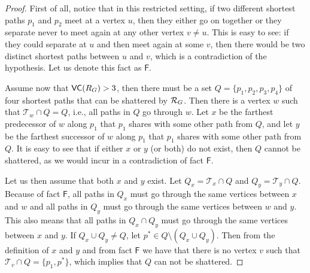\begin{proof}
  First of all, notice that in this restricted setting, if two different
  shortest paths $p_1$ and $p_2$ meet at a vertex $u$, then they either go on
  together or %
  they separate never to meet again at any other
  vertex $v\neq u$. This is easy to see: if they could separate at $u$ and then
  meet again at some $v$, then there would be two distinct shortest paths
  between $u$ and $v$, which is a contradiction of the hypothesis. Let us denote
  this fact as $\mathsf{F}$.

  Assume now that $\mathsf{VC}(R_G)>3$, then there must be a set
  $Q=\{p_1,p_2,p_3,p_4\}$ of four shortest paths that can be shattered by
  $\mathcal{R}_G$. Then there is a vertex $w$ such that $\mathcal{T}_w\cap Q=Q$, i.e.,
  all paths in $Q$ go through $w$. Let $x$ be the farthest predecessor of $w$
  along $p_1$ that $p_1$ shares with some other path from $Q$, and let $y$ be
  the farthest successor of $w$ along $p_1$ that $p_1$ shares with some other
  path from $Q$. It is easy to see that if either $x$ or $y$ (or both) do not
  exist, then $Q$ cannot be shattered, as we would incur in a contradiction of
  fact $\mathsf{F}$. 
  
  Let us then assume that both $x$ and $y$ exist.
  Let $Q_x=\mathcal{T}_x\cap Q$ and $Q_y=\mathcal{T}_y\cap Q$.
  Because of fact $\mathsf{F}$, all paths in $Q_x$ must go through the same vertices
  between $x$ and $w$ and all paths in $Q_y$ must go through the same vertices
  between $w$ and $y$. This also means that all paths in $Q_x\cap Q_y$ must go
  through the same vertices between $x$ and $y$. If $Q_x\cup Q_y\neq Q$, let
  $p^*\in Q\setminus(Q_x\cup Q_y)$. Then from the definition of $x$ and $y$ and
  from fact $\mathsf{F}$ we have that there is no vertex $v$ such that
  $\mathcal{T}_v\cap Q=\{p_1,p^*\}$, which implies that $Q$ can not be
  shattered. 
  

\end{proof}
